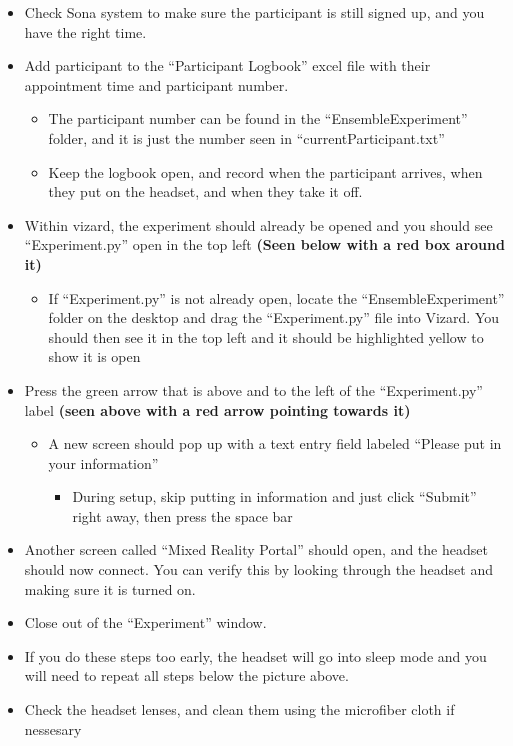 \documentclass[
]{article}
\providecommand{\tightlist}{%
  \setlength{\itemsep}{0pt}\setlength{\parskip}{0pt}}
\begin{document}
\begin{itemize}
\tightlist
\item
  Check Sona system to make sure the participant is still signed up, and
  you have the right time.
\item
  Add participant to the ``Participant Logbook'' excel file with their
  appointment time and participant number.

  \begin{itemize}
  \tightlist
  \item
    The participant number can be found in the ``EnsembleExperiment''
    folder, and it is just the number seen in ``currentParticipant.txt''
  \item
    Keep the logbook open, and record when the participant arrives, when
    they put on the headset, and when they take it off.
  \end{itemize}
\item
  Within vizard, the experiment should already be opened and you should
  see ``Experiment.py'' open in the top left \textbf{(Seen below with a
  red box around it)}

  \begin{itemize}
  \tightlist
  \item
    If ``Experiment.py'' is not already open, locate the
    ``EnsembleExperiment'' folder on the desktop and drag the
    ``Experiment.py'' file into Vizard. You should then see it in the
    top left and it should be highlighted yellow to show it is open
  \end{itemize}
\end{itemize}

\begin{itemize}
\tightlist
\item
  Press the green arrow that is above and to the left of the
  ``Experiment.py'' label \textbf{(seen above with a red arrow pointing
  towards it)}

  \begin{itemize}
  \tightlist
  \item
    A new screen should pop up with a text entry field labeled ``Please
    put in your information''

    \begin{itemize}
    \tightlist
    \item
      During setup, skip putting in information and just click
      ``Submit'' right away, then press the space bar
    \end{itemize}
  \end{itemize}
\item
  Another screen called ``Mixed Reality Portal'' should open, and the
  headset should now connect. You can verify this by looking through the
  headset and making sure it is turned on.
\item
  Close out of the ``Experiment'' window.
\item
  If you do these steps too early, the headset will go into sleep mode
  and you will need to repeat all steps below the picture above.
\item
  Check the headset lenses, and clean them using the microfiber cloth if
  nessesary
\end{itemize}
\end{document}
